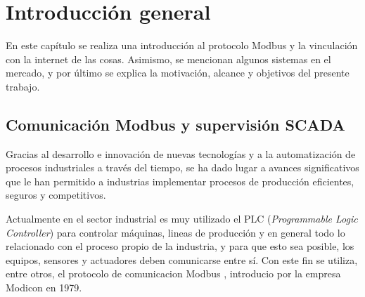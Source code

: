 
\chapter{Introducción general} %

\label{Chapter1} %
\label{IntroGeneral}


\newcommand{\keyword}[1]{\textbf{#1}}
\newcommand{\tabhead}[1]{\textbf{#1}}
\newcommand{\code}[1]{\texttt{#1}}
\newcommand{\file}[1]{\texttt{\bfseries#1}}
\newcommand{\option}[1]{\texttt{\itshape#1}}
\newcommand{\grados}{$^{\circ}$}

En este capítulo se realiza una introducción al protocolo Modbus y la vinculación con la internet de las cosas. Asimismo, se mencionan algunos sistemas en el mercado, y por último se explica la motivación, alcance y objetivos del presente trabajo.




\section{Comunicación Modbus y supervisión SCADA}

Gracias al desarrollo e innovación de nuevas tecnologías y a la automatización de procesos industriales a través del tiempo, se ha dado lugar a avances significativos que le han permitido a industrias implementar procesos de producción eficientes, seguros y competitivos.

Actualmente en el sector industrial es muy utilizado el PLC (\textit{Programmable Logic Controller}) \citep{WEBSITE:1} para controlar máquinas, lineas de producción y en general todo lo relacionado con el proceso propio de la industria, y para que esto sea posible, los equipos, sensores y actuadores deben comunicarse entre sí. Con este fin se utiliza, entre otros, el protocolo de comunicacion Modbus  \citep{WEBSITE:2}, introducio por la empresa Modicon en 1979. 

